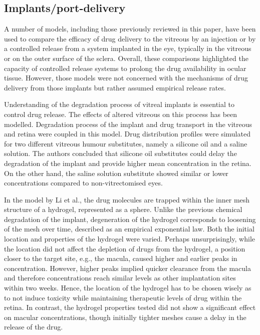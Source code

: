 \documentclass{article}
\begin{document}
\subsection*{Implants/port-delivery}

A number of models, including those previously reviewed in this paper, have been used to compare the efficacy of drug delivery to the vitreous by an injection or by a controlled release from a system implanted in the eye, typically in the vitreous or on the outer surface of the sclera.\cite{Jooybar_2014,Kathawate_2008,Kavousanakis_2014,Park_2005}
Overall, these comparisons highlighted the capacity of controlled release systems to prolong the drug availability in ocular tissue.
However, those models were not concerned with the mechanisms of drug delivery from those implants but rather assumed empirical release rates.

Understanding of the degradation process of vitreal implants is essential to control drug release.
The effects of altered vitreous on this process has been modelled.\cite{Ferreira_2020}
Degradation process of the implant and drug transport in the vitreous and retina were coupled in this model.
Drug distribution profiles were simulated for two different vitreous humour substitutes, namely a silicone oil and a saline solution.
The authors concluded that silicone oil substitutes could delay the degradation of the implant and provide higher mean concentration in the retina.
On the other hand, the saline solution substitute showed similar or lower concentrations compared to non-vitrectomised eyes.\cite{Ferreira_2020}

In the model by Li et al., the drug molecules are trapped within the inner mesh structure of a hydrogel, represented as a sphere.\cite{Li_2022a}
Unlike the previous chemical degradation of the implant, degeneration of the hydrogel corresponds to loosening of the mesh over time, described as an empirical exponential law.
Both the initial location and properties of the hydrogel were varied.
Perhaps unsurprisingly, while the location did not affect the depletion of drugs from the hydrogel, a position closer to the target site, e.g., the macula, caused higher and earlier peaks in concentration.
However, higher peaks implied quicker clearance from the macula and therefore concentrations reach similar levels as other implantation sites within two weeks.\cite{Li_2022a}
Hence, the location of the hydrogel has to be chosen wisely as to not induce toxicity while maintaining therapeutic levels of drug within the retina.
In contrast, the hydrogel properties tested did not show a significant effect on macular concentrations, though initially tighter meshes cause a delay in the release of the drug.
\end{document}
